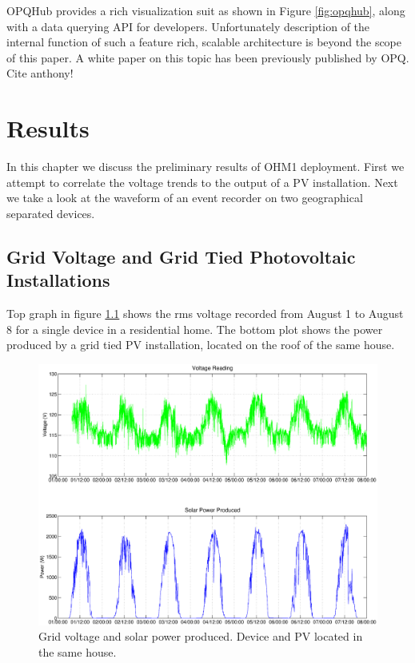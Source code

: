 OPQHub provides a rich visualization suit as shown in Figure \ref{fig:opqhub}, along with a data querying API for developers. Unfortunately description of the internal function
of such a feature rich, scalable architecture is beyond the scope of this paper. A white paper on this topic has been previously published by OPQ. Cite anthony!

\chapter{Results}

In this chapter we discuss the preliminary results of  OHM1 deployment. First we attempt to correlate the voltage trends to the output of a PV installation. Next we take a look at the 
waveform of an event recorder on two geographical separated devices.

\section{Grid Voltage and Grid Tied Photovoltaic Installations}
Top graph in figure \ref{fig:samehouse} shows the rms voltage recorded from August 1 to August 8 for a single device in a residential home. The bottom plot shows the power produced by 
a grid tied PV installation, located on the roof of the same house.

\begin{figure}[h!]
\centering
\includegraphics[width=\textwidth]{img/solarCorelationSameHouse.eps}
\caption{Grid voltage and solar power produced. Device and PV located in the same house.}
\label{fig:samehouse}
\end{figure}

